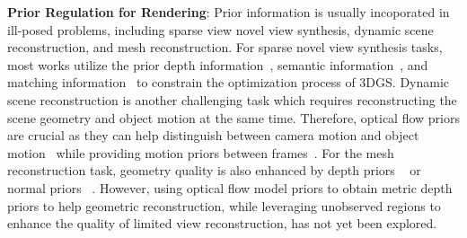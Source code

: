 %
\textbf{Prior Regulation for Rendering}:
Prior information is usually incoporated in ill-posed problems,
including sparse view novel view synthesis, dynamic scene reconstruction,
and mesh reconstruction.
For sparse novel view synthesis tasks, most works utilize the prior depth information~\citep{deng2022depth, roessle2022dense, song2024darf, wang2023sparsenerf, zhu2023fsgs, xiong2023sparsegs, paliwal2024coherentgs}, semantic information~\citep{jain2021putting, wynn2023diffusionerf, xiong2023sparsegs}, and matching information~\citep{paliwal2024coherentgs, lao2024corresnerf} 
to constrain the optimization process of 3DGS.
Dynamic scene reconstruction is another challenging
task which requires reconstructing the scene geometry and object motion at the same
time. 
Therefore, optical flow priors are crucial as
they can help distinguish between camera motion 
and object motion~\citep{liu2023robust} 
while providing motion priors between frames~\citep{Liu_2023_CVPR, gao2021dynamic, li2023dynibar, 
wang2023flow, guo2023forward, tian2023mononerf}.
For the mesh reconstruction task,
geometry quality is also
enhanced by depth priors  
~\citep{wei2021nerfingmvs, yu2022monosdf, turkulainen2024dn} 
or normal priors ~\citep{yu2022monosdf, turkulainen2024dn}. 
%
However, using optical flow model priors to obtain metric depth priors 
to help geometric reconstruction, 
while leveraging unobserved regions to enhance the quality 
of limited view reconstruction, has not yet been explored.
%


